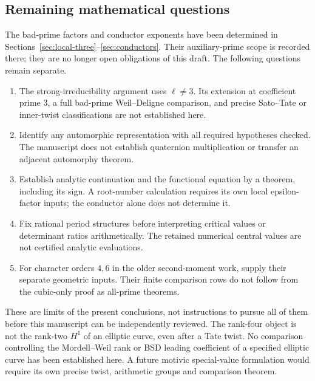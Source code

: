 \subsection{Remaining mathematical questions}
The bad-prime factors and conductor exponents have been determined in
Sections~\ref{sec:local-three}--\ref{sec:conductors}. Their auxiliary-prime
scope is recorded there; they are no longer open obligations of this draft.
The following questions remain separate.
\begin{enumerate}
\item The strong-irreducibility argument uses $\ell\ne3$. Its extension
at coefficient prime $3$, a full bad-prime Weil--Deligne comparison, and
precise Sato--Tate or inner-twist classifications are not established here.
\item Identify any automorphic representation with all required
hypotheses checked. The manuscript does not establish quaternion
multiplication or transfer an adjacent automorphy theorem.
\item Establish analytic continuation and the functional equation by a
theorem, including its sign. A root-number calculation requires its own
local epsilon-factor inputs; the conductor alone does not determine it.
\item Fix rational period structures before interpreting critical
values or determinant ratios arithmetically. The retained numerical
central values are not certified analytic evaluations.
\item For character orders $4,6$ in the older second-moment work,
supply their separate geometric inputs. Their finite comparison rows do
not follow from the cubic-only proof as all-prime theorems.
\end{enumerate}
These are limits of the present conclusions, not instructions to pursue
all of them before this manuscript can be independently reviewed.
The rank-four object is not the rank-two $H^1$ of an elliptic curve, even
after a Tate twist. No comparison controlling the Mordell--Weil rank or
BSD leading coefficient of a specified elliptic curve has been established
here. A future motivic special-value formulation would require its own
precise twist, arithmetic groups and comparison theorem.
